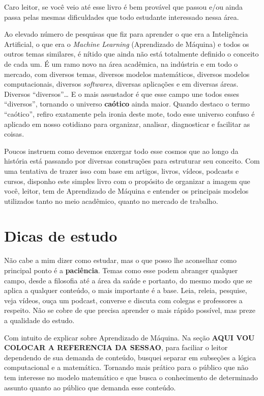 \documentclass[
]{book}
\begin{document}
Caro leitor, se você veio até esse livro é bem provável que passou e/ou ainda passa pelas mesmas dificuldades que todo estudante interessado nessa área.

Ao elevado número de pesquisas que fiz para aprender o que era a Inteligência Artificial, o que era o \emph{Machine Learning} (Aprendizado de Máquina) e todos os outros temas similares, é nítido que ainda não está totalmente definido o conceito de cada um. É um ramo novo na área acadêmica, na indústria e em todo o mercado, com diversos temas, diversos modelos matemáticos, diversos modelos computacionais, diversos \emph{softwares}, diversas aplicações e em diversas áreas. Diversos ``diversos''\ldots{} E o mais assustador é que esse campo une todos esses ``diversos'', tornando o universo \textbf{caótico} ainda maior. Quando destaco o termo ``caótico'', refiro exatamente pela ironia deste mote, todo esse universo confuso é aplicado em nosso cotidiano para organizar, analisar, diagnosticar e facilitar as coisas.

Poucos instruem como devemos enxergar todo esse cosmos que ao longo da história está passando por diversas construções para estruturar seu conceito. Com uma tentativa de trazer isso com base em artigos, livros, vídeos, podcasts e cursos, disponho este simples livro com o propósito de organizar a imagem que você, leitor, tem de Aprendizado de Máquina e entender os principais modelos utilizados tanto no meio acadêmico, quanto no mercado de trabalho.

\hypertarget{dicas-de-estudo}{%
\section{Dicas de estudo}\label{dicas-de-estudo}}

Não cabe a mim dizer como estudar, mas o que posso lhe aconselhar como principal ponto é a \textbf{paciência}. Temas como esse podem abranger qualquer campo, desde a filosofia até a área da saúde e portanto, do mesmo modo que se aplica a qualquer conteúdo, o mais importante é a base. Leia, releia, pesquise, veja vídeos, ouça um podcast, converse e discuta com colegas e professores a respeito. Não se cobre de que precisa aprender o mais rápido possível, mas preze a qualidade do estudo.

Com intuito de explicar sobre Aprendizado de Máquina. Na seção \textbf{AQUI VOU COLOCAR A REFERENCIA DA SESSAO}, para faciliar o leitor dependendo de sua demanda de conteúdo, busquei separar em subseções a lógica computacional e a matemática. Tornando mais prático para o público que não tem interesse no modelo matemático e que busca o conhecimento de determinado assunto quanto ao público que demanda esse conteúdo.
\end{document}

